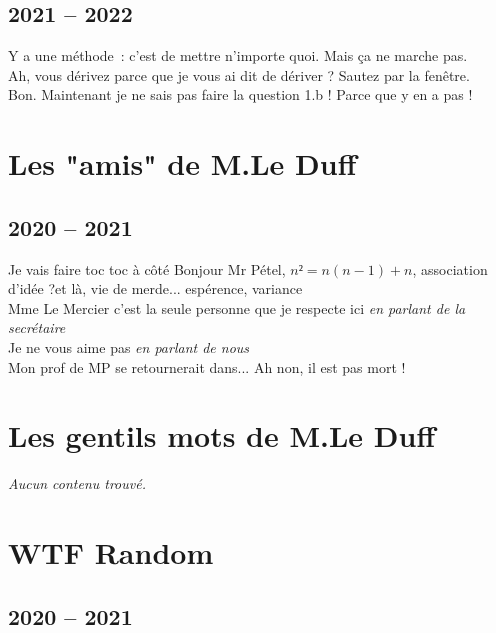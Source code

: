 \documentclass[french, a4paper, openany]{book}
\begin{document}
\section{2021 -- 2022}

	\noindent \og Y a une méthode~: c'est de mettre n'importe quoi. Mais ça ne marche pas. \fg \\
	\og Ah, vous dérivez parce que je vous ai dit de dériver ? Sautez par la fenêtre. \fg \\
	\og Bon. Maintenant je ne sais pas faire la question 1.b ! Parce que y en a pas ! \fg \\

\chapter{Les "amis" de M.Le Duff}

\section{2020 -- 2021}

	\noindent \og Je vais faire toc toc à côté \fg Bonjour Mr Pétel, $n² = n(n-1) + n$, association d'idée ?\og et là, vie de merde... \fg espérence, variance\og \fg \\
	\og Mme Le Mercier c'est la seule personne que je respecte ici \fg \emph{en parlant de la secrétaire} \\
	\og Je ne vous aime pas \fg \emph{en parlant de nous} \\
	\og Mon prof de MP se retournerait dans... Ah non, il est pas mort ! \fg \\

\chapter{Les gentils mots de M.Le Duff}

	 \noindent \emph{Aucun contenu trouvé.} \\
 
\chapter{WTF Random}

\section{2020 -- 2021}
\end{document}

